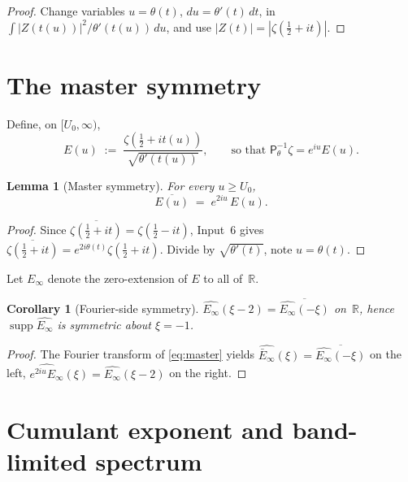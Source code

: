 \documentclass[11pt,a4paper]{article}
\newtheorem{lemma}[theorem]{Lemma}
\newtheorem{corollary}[theorem]{Corollary}
\theoremstyle{definition}
\DeclareMathOperator{\supp}{supp}
\newcommand{\ipp}{\mathsf{P}_\theta^{-1}}
\newcommand{\R}{\mathbb{R}}
\begin{document}
\begin{proof}
Change variables $u=\theta(t)$, $du=\theta'(t)\,dt$, in
$\int |Z(t(u))|^2/\theta'(t(u))\,du$, and use $|Z(t)|=|\zeta(\tfrac12+it)|$.
\end{proof}

\section{The master symmetry}
\label{sec:symmetry}

Define, on $[U_0,\infty)$,
\begin{equation}
  E(u) \;:=\; \frac{\zeta(\tfrac12+it(u))}{\sqrt{\theta'(t(u))}},
  \qquad \text{so that } \ipp\zeta = e^{iu}E(u).
\end{equation}

\begin{lemma}[Master symmetry]\label{lem:master}
For every $u \ge U_0$,
\begin{equation}
  \overline{E(u)} \;=\; e^{2iu}\,E(u).
  \label{eq:master}
\end{equation}
\end{lemma}

\begin{proof}
Since $\overline{\zeta(\tfrac12+it)} = \zeta(\tfrac12-it)$, Input~6 gives
$\overline{\zeta(\tfrac12+it)} = e^{2i\theta(t)}\zeta(\tfrac12+it)$. Divide
by $\sqrt{\theta'(t)}$, note $u=\theta(t)$.
\end{proof}

Let $E_\infty$ denote the zero-extension of $E$ to all of~$\R$.

\begin{corollary}[Fourier-side symmetry]\label{cor:FE-spectral}
$\widehat{E_\infty}(\xi - 2) = \overline{\widehat{E_\infty}(-\xi)}$ on~$\R$, hence
$\supp\widehat{E_\infty}$ is symmetric about $\xi = -1$.
\end{corollary}

\begin{proof}
The Fourier transform of \eqref{eq:master} yields
$\widehat{\bar E_\infty}(\xi) = \overline{\widehat{E_\infty}(-\xi)}$ on the left,
$\widehat{e^{2iu}E_\infty}(\xi) = \widehat{E_\infty}(\xi-2)$ on the right.
\end{proof}

\section{Cumulant exponent and band-limited spectrum}
\label{sec:cumulant}
\end{document}
